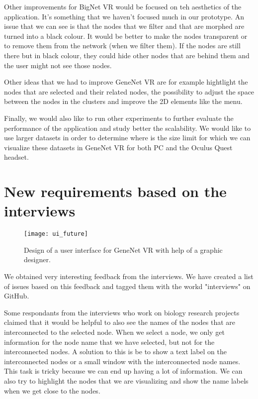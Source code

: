 Other improvements for BigNet VR would be focused on teh aesthetics of the application. It's something that we haven't focused much in our prototype. An issue that we can see is that the nodes that we filter and that are morphed are turned into a black colour. It would be better to make the nodes transparent or to remove them from the network (when we filter them). If the nodes are still there but in black colour, they could hide other nodes that are behind them and the user might not see those nodes.

Other ideas that we had to improve GeneNet VR are for example hightlight the nodes that are selected and their related nodes, the possibility to adjust the space between the nodes in the clusters and improve the 2D elements like the menu.

Finally, we would also like to run other experiments to further evaluate the performance of the application and study better the scalability. We would like to use larger datasets in order to determine where is the size limit for which we can visualize these datasets in GeneNet VR for both PC and the Oculus Quest headset.

\section{New requirements based on the interviews}
\begin{figure}[h!]
    \setlength{\tempheight}{15ex}
    \centering
    \texttt{[image: ui\_future]}
    \caption{Design of a user interface for GeneNet VR with help of a graphic designer.}
    \label{fig:issues}
\end{figure}

We obtained very interesting feedback from the interviews. We have created a list of issues based on this feedback and tagged them with the workd "interviews" on GitHub.

Some respondants from the interviews who work on biology research projects claimed that it would be helpful to also see the names of the nodes that are interconnected to the selected node. When we select a node, we only get information for the node name that we have selected, but not for the interconnected nodes. A solution to this is be to show a text label on the interconnected nodes or a small window with the interconnected node names. This task is tricky because we can end up having a lot of information. We can also try to highlight the nodes that we are visualizing and show the name labels when we get close to the nodes.


